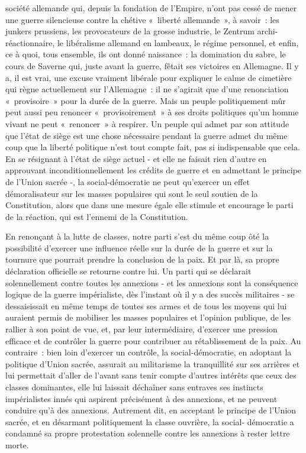 \documentclass[french,twoside]{book} %
\begin{document}
société allemande qui, depuis la fondation de l’Empire, n’ont pas cessé de mener une guerre silencieuse contre la chétive « liberté allemande », à savoir : les junkers prussiens, les provocateurs de la grosse industrie, le Zentrum archi-réactionnaire, le libéralisme allemand en lambeaux, le régime personnel, et enfin, ce à quoi, tous ensemble, ils ont donné naissance : la domination du sabre, le cours de Saverne qui, juste avant la guerre, fêtait ses victoires en Allemagne. Il y a, il est vrai, une excuse vraiment libérale pour expliquer le calme de cimetière qui règne actuellement sur l’Allemagne : il ne s’agirait que d’une renonciation « provisoire » pour la durée de la guerre. Mais un peuple politiquement mûr peut aussi peu renoncer « provisoirement » à ses droits politiques qu’un homme vivant ne peut « renoncer » à respirer. Un peuple qui admet par son attitude que l’état de siège est une chose nécessaire pendant la guerre admet du même coup que la liberté politique n’est tout compte fait, pas si indispensable que cela. En se résignant à l’état de siège actuel - et elle ne faisait rien d’autre en approuvant inconditionnellement les crédits de guerre et en admettant le principe de l’Union sacrée -, la social-démocratie ne peut qu’exercer un effet démoralisateur sur les masses populaires qui sont le seul soutien de la Constitution, alors que dans une mesure égale elle stimule et encourage le parti de la réaction, qui est l’ennemi de la Constitution.\par
En renonçant à la lutte de classes, notre parti s’est du même coup ôté la possibilité d’exercer une influence réelle sur la durée de la guerre et sur la tournure que pourrait prendre la conclusion de la paix. Et par là, sa propre déclaration officielle se retourne contre lui. Un parti qui se déclarait solennellement contre toutes les annexions - et les annexions sont la conséquence logique de la guerre impérialiste, dès l’instant où il y a des succès militaires - se dessaisissait en même temps de toutes ses armes et de tous les moyens qui lui auraient permis de mobiliser les masses populaires et l’opinion publique, de les rallier à son point de vue, et, par leur intermédiaire, d’exercer une pression efficace et de contrôler la guerre pour contribuer au rétablissement de la paix. Au contraire : bien loin d’exercer un contrôle, la social-démocratie, en adoptant la politique d’Union sacrée, assurait au militarisme la tranquillité sur ses arrières et lui permettait d’aller de l’avant sans tenir compte d’autres intérêts que ceux des classes dominantes, elle lui laissait déchaîner sans entraves ses instincts impérialistes innés qui aspirent précisément à des annexions, et ne peuvent conduire qu’à des annexions. Autrement dit, en acceptant le principe de l’Union sacrée, et en désarmant politiquement la classe ouvrière, la social- démocratie a condamné sa propre protestation solennelle contre les annexions à rester lettre morte.\par
\end{document}
